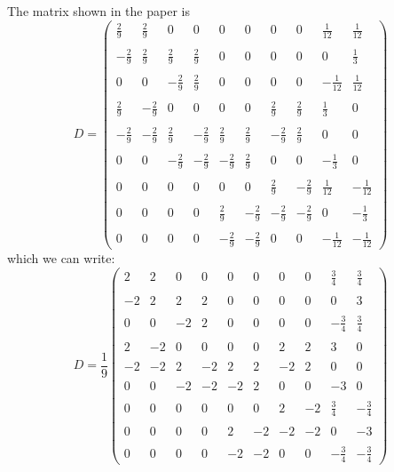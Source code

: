 The matrix shown in the paper is
\[
D=
\left(
\begin{array}{cccccccccc}
\frac29 & \frac29 & 0 & 0 & 0 & 0 & 0 & 0 & \frac{1}{12} & \frac{1}{12} \\ \\
-\frac29 & \frac29 & \frac29 & \frac29 & 0 & 0 & 0 & 0 & 0 & \frac13 \\ \\
0 & 0 & -\frac29 & \frac29 & 0 & 0 & 0 & 0 & -\frac{1}{12} & \frac{1}{12} \\ \\
\frac29 & -\frac29 & 0 & 0 & 0 & 0 & \frac29 & \frac29 & \frac13  & 0 \\ \\ 
-\frac29 & -\frac29 & \frac29 & -\frac29 & \frac29 & \frac29 & -\frac29 & \frac29  &0 &0\\ \\
0 & 0 & -\frac29 & -\frac29 & -\frac29 & \frac29 & 0 & 0 & -\frac13 & 0 \\ \\
0 & 0 & 0 & 0 & 0 & 0 & \frac29 & -\frac29 & \frac{1}{12} & -\frac{1}{12} \\ \\
0 & 0 & 0 & 0 & \frac29 & -\frac29 & -\frac29 & -\frac29 & 0 & -\frac13 \\ \\ 
0 & 0 & 0 & 0 & -\frac29 & -\frac29 & 0 & 0 & -\frac{1}{12} & -\frac{1}{12}
\end{array}
\right)
\]
which we can write: 
\[
D=
\frac19
\left(
\begin{array}{cccccccccc}
2 & 2 & 0 & 0 & 0 & 0 & 0 & 0 & \frac{3}{4} & \frac{3}{4} \\ \\
-2 & 2 & 2 & 2 & 0 & 0 & 0 & 0 & 0 & 3 \\ \\
0 & 0 & -2 & 2 & 0 & 0 & 0 & 0 & -\frac{3}{4} & \frac{3}{4} \\ \\
2 & -2 & 0 & 0 & 0 & 0 & 2 & 2 & 3  & 0 \\ \\ 
-2 & -2 & 2 & -2 & 2 & 2 & -2 & 2  &0 &0\\ \\
0 & 0 & -2 & -2 & -2 & 2 & 0 & 0 & -3 & 0 \\ \\
0 & 0 & 0 & 0 & 0 & 0 & 2 & -2 & \frac{3}{4} & -\frac{3}{4} \\ \\
0 & 0 & 0 & 0 & 2 & -2 & -2 & -2 & 0 & -3 \\ \\ 
0 & 0 & 0 & 0 & -2 & -2 & 0 & 0 & -\frac{3}{4} & -\frac{3}{4}
\end{array}
\right)
\]


